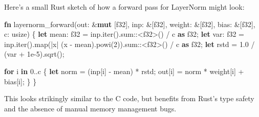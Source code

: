 \documentclass[
  letterpaper,
  DIV=11,
  numbers=noendperiod]{scrreprt}
\newenvironment{Shaded}{\begin{snugshade}}{\end{snugshade}}
\newcommand{\ControlFlowTok}[1]{\textcolor[rgb]{0.00,0.23,0.31}{\textbf{#1}}}
\newcommand{\DataTypeTok}[1]{\textcolor[rgb]{0.68,0.00,0.00}{#1}}
\newcommand{\DecValTok}[1]{\textcolor[rgb]{0.68,0.00,0.00}{#1}}
\newcommand{\KeywordTok}[1]{\textcolor[rgb]{0.00,0.23,0.31}{\textbf{#1}}}
\newcommand{\NormalTok}[1]{\textcolor[rgb]{0.00,0.23,0.31}{#1}}
\newcommand{\OperatorTok}[1]{\textcolor[rgb]{0.37,0.37,0.37}{#1}}
\newcommand{\PreprocessorTok}[1]{\textcolor[rgb]{0.68,0.00,0.00}{#1}}
\begin{document}
Here's a small Rust sketch of how a forward pass for LayerNorm might
look:

\begin{Shaded}
\begin{Highlighting}[]
\KeywordTok{fn}\NormalTok{ layernorm\_forward(out}\OperatorTok{:} \OperatorTok{\&}\KeywordTok{mut}\NormalTok{ [}\DataTypeTok{f32}\NormalTok{]}\OperatorTok{,}\NormalTok{ inp}\OperatorTok{:} \OperatorTok{\&}\NormalTok{[}\DataTypeTok{f32}\NormalTok{]}\OperatorTok{,}\NormalTok{ weight}\OperatorTok{:} \OperatorTok{\&}\NormalTok{[}\DataTypeTok{f32}\NormalTok{]}\OperatorTok{,}\NormalTok{ bias}\OperatorTok{:} \OperatorTok{\&}\NormalTok{[}\DataTypeTok{f32}\NormalTok{]}\OperatorTok{,}\NormalTok{ c}\OperatorTok{:} \DataTypeTok{usize}\NormalTok{) }\OperatorTok{\{}
    \KeywordTok{let}\NormalTok{ mean}\OperatorTok{:} \DataTypeTok{f32} \OperatorTok{=}\NormalTok{ inp}\OperatorTok{.}\NormalTok{iter()}\OperatorTok{.}\PreprocessorTok{sum::}\OperatorTok{\textless{}}\DataTypeTok{f32}\OperatorTok{\textgreater{}}\NormalTok{() }\OperatorTok{/}\NormalTok{ c }\KeywordTok{as} \DataTypeTok{f32}\OperatorTok{;}
    \KeywordTok{let}\NormalTok{ var}\OperatorTok{:} \DataTypeTok{f32} \OperatorTok{=}\NormalTok{ inp}\OperatorTok{.}\NormalTok{iter()}\OperatorTok{.}\NormalTok{map(}\OperatorTok{|}\NormalTok{x}\OperatorTok{|}\NormalTok{ (x }\OperatorTok{{-}}\NormalTok{ mean)}\OperatorTok{.}\NormalTok{powi(}\DecValTok{2}\NormalTok{))}\OperatorTok{.}\PreprocessorTok{sum::}\OperatorTok{\textless{}}\DataTypeTok{f32}\OperatorTok{\textgreater{}}\NormalTok{() }\OperatorTok{/}\NormalTok{ c }\KeywordTok{as} \DataTypeTok{f32}\OperatorTok{;}
    \KeywordTok{let}\NormalTok{ rstd }\OperatorTok{=} \DecValTok{1.0} \OperatorTok{/}\NormalTok{ (var }\OperatorTok{+} \DecValTok{1e{-}5}\NormalTok{)}\OperatorTok{.}\NormalTok{sqrt()}\OperatorTok{;}

    \ControlFlowTok{for}\NormalTok{ i }\KeywordTok{in} \DecValTok{0}\OperatorTok{..}\NormalTok{c }\OperatorTok{\{}
        \KeywordTok{let}\NormalTok{ norm }\OperatorTok{=}\NormalTok{ (inp[i] }\OperatorTok{{-}}\NormalTok{ mean) }\OperatorTok{*}\NormalTok{ rstd}\OperatorTok{;}
\NormalTok{        out[i] }\OperatorTok{=}\NormalTok{ norm }\OperatorTok{*}\NormalTok{ weight[i] }\OperatorTok{+}\NormalTok{ bias[i]}\OperatorTok{;}
    \OperatorTok{\}}
\OperatorTok{\}}
\end{Highlighting}
\end{Shaded}

This looks strikingly similar to the C code, but benefits from Rust's
type safety and the absence of manual memory management bugs.
\end{document}
